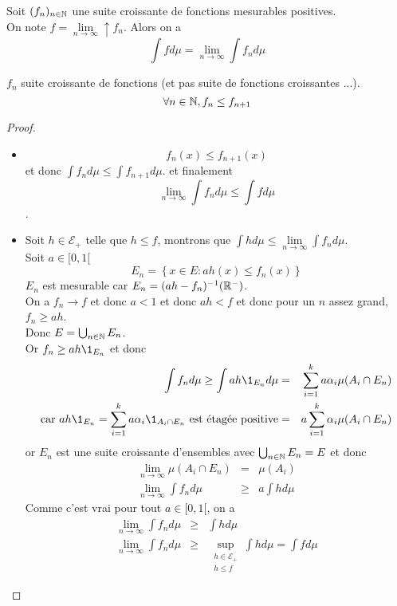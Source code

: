 \begin{theorem} \label{thm:convergence_monotone}
	Soit $(f_n)_{n \in \mathbb{N}}$ une suite croissante de fonctions mesurables positives.\\
	On note $f = \lim\limits_{n \to \infty}\uparrow f_n$.
	Alors on a
	$$ \int f d\mu = \lim\limits_{n \to \infty} \int f_n d\mu $$
\end{theorem}

\begin{remarque}
	$f_n$ suite croissante de fonctions (et pas suite de fonctions croissantes ...).
	$$ \forall n \in \mathbb{N}, f_n \leq f_{n+1} $$
\end{remarque}


\begin{proof}
	\begin{itemize}
		\item $$f_n (x) \leq f_{n+1}(x)$$ et donc $\int f_n d\mu \leq \int f_{n+1} d\mu$.
		      et finalement $$\lim\limits_{n \to \infty} \int f_n d\mu \leq \int f d\mu$$.
		\item Soit $h \in \mathcal{E}_+$ telle que $h \leq f$, montrons que $\int h d\mu \leq \lim\limits_{n \to \infty} \int f_n d\mu$.\\
		      Soit $a \in [0,1[$
		      $$ E_n = \left\{ x \in E :  ah(x) \leq f_n(x) \right\} $$
		      $E_n$ est mesurable car $E_n = (ah-f_n)^{-1}(\mathbb{R}^-)$.\\
		      On a $f_n \to f$ et donc $a < 1$ et donc $ah < f$ et donc pour un
		      $n$ assez grand, $f_n \geq ah$.\\
		      Donc $E = \bigcup_{n \in \mathbb{N}} E_n$.\\
		      Or $ f_n \geq ah \1_{E_n} $ et donc
		      \begin{eqnarray*}
			      \int f_n d\mu \geq \int ah \1_{E_n} d\mu &=& \sum_{i=1}^k a \alpha_i \mu (A_i \cap E_n) \\
			      \text{car } ah\1_{E_n} = \sum_{i=1}^k a \alpha_i \1_{A_i \cap E_n} \  \text{est étagée positive} &=& a \sum_{i=1}^k \alpha_i \mu(A_i \cap E_n) \\
		      \end{eqnarray*}
		      or $E_n$ est une suite croissante d'ensembles avec $\bigcup_{n \in \mathbb{N}} E_n = E$ et donc
		      \begin{eqnarray*}
			      \lim\limits_{n \to \infty} \mu(A_i \cap E_n) &=& \mu(A_i)\\
			      \lim \limits_{n \to \infty} \int f_n d\mu &\geq& a \int h d\mu
		      \end{eqnarray*}
		      Comme c'est vrai pour tout $a \in [0,1[$, on a
		      \begin{eqnarray*}
			      \lim \limits_{n \to \infty} \int f_n d\mu &\geq&  \int h d\mu\\
			      \lim \limits_{n \to \infty} \int f_n d\mu &\geq& \sup\limits_{\substack{h \in \mathcal{E}_+ \\ h \leq f}} \int h d\mu = \int f d\mu
		      \end{eqnarray*}
	\end{itemize}
\end{proof}


